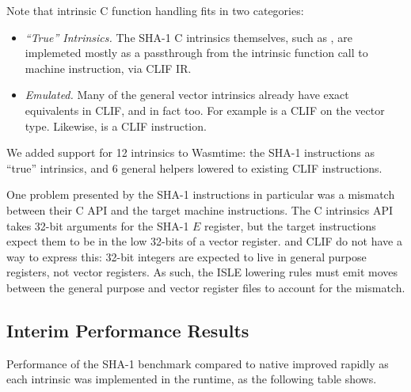 Note that intrinsic C function handling fits in two categories:
\begin{itemize}
    \item \emph{``True'' Intrinsics.}
        The SHA-1 C intrinsics themselves, such as , are
        implemeted mostly as a passthrough from the intrinsic function call to
        machine instruction, via CLIF IR.
    \item \emph{Emulated.}
        Many of the general vector intrinsics already have exact equivalents in
        CLIF, and in fact \wasm too.  For example  is a CLIF
         on the vector  type.  Likewise,
         is a CLIF  instruction.
\end{itemize}

We added support for 12 intrinsics to Wasmtime: the SHA-1 instructions as
``true'' intrinsics, and 6 general helpers lowered to existing CLIF
instructions.

One problem presented by the SHA-1 instructions in particular was a mismatch
between their C API and the target machine instructions.  The C intrinsics API
takes 32-bit arguments for the SHA-1 $E$ register, but the target instructions
expect them to be in the low 32-bits of a vector register. \wasm and CLIF do not
have a way to express this: 32-bit integers are expected to live in general
purpose registers, not vector registers. As such, the ISLE lowering rules must
emit moves between the general purpose and vector register files to account for
the mismatch.

\subsection{Interim Performance Results}
\label{sec:interimresults}

Performance of the SHA-1 benchmark compared to native improved rapidly as each
intrinsic was implemented in the runtime, as the following table shows.

\newcommand{\changeshaonec}{Intrinsic: \code{vsha1cq\_u32}}
\newcommand{\changeshaonepm}{Intrinsics: \code{vsha1\{p,m\}q\_u32}}
\newcommand{\changeshaoneh}{Intrinsic: \code{vsha1h\_u32}}
\newcommand{\changeshaonesuzero}{Intrinsic: \code{vsha1su0q\_u32}}
\newcommand{\changeshaonesuone}{Intrinsic: \code{vsha1su1q\_u32}}
\newcommand{\changevaddqu}{Intrinsic: \code{vaddq\_u32}}
\newcommand{\changevdupqnu}{Intrinsic: \code{vdupq\_n\_u32}}
\newcommand{\changevgetqlaneu}{Intrinsic: \code{vgetq\_lane\_u32}}
\newcommand{\changevreinterpretq}{Intrinsics: \code{vreinterpretq\_\{u32\_u8,u8\_u32\}}}
\newcommand{\changevrevqu}{Intrinsic: \code{vrev32q\_u8}}

